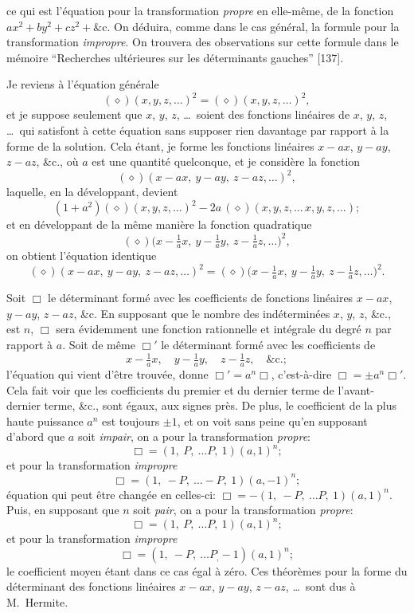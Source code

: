 \documentclass[11pt,a4paper]{article}
\begin{document}
\medskip

\noindent ce qui est l'\'equation pour la transformation \textit{propre} en elle-m\^eme, de la fonction $ax^2 + by^2 + cz^2 + \&\mathrm{c}.$ On d\'eduira, comme dans le cas g\'en\'eral, la formule pour la transformation \textit{impropre}. On trouvera des observations sur cette formule dans le m\'emoire ``Recherches ult\'erieures sur les d\'eterminants gauches'' [137].

\medskip

Je reviens \`a l'\'equation g\'en\'erale
\[
(\diamond)(x,y,z,\ldots)^2 = (\diamond)(x,y,z,\ldots)^2,
\]
et je suppose seulement que $x$, $y$, $z$, \ldots\ soient des fonctions lin\'eaires de $x$, $y$, $z$, \ldots\ qui satisfont \`a cette \'equation sans supposer rien davantage par rapport \`a la forme de la solution. Cela \'etant, je forme les fonctions lin\'eaires $x - ax$, $y - ay$, $z - az$, \&c., o\`u $a$ est une quantit\'e quelconque, et je consid\`ere la fonction
\[
(\diamond)(x - ax,\ y - ay,\ z - az,\ldots)^2,
\]
laquelle, en la d\'eveloppant, devient
\[
(1 + a^2)(\diamond)(x,y,z,\ldots)^2 - 2a\,(\diamond)(x,y,z,\ldots\,x,y,z,\ldots);
\]
et en d\'eveloppant de la m\^eme mani\`ere la fonction quadratique
\[
(\diamond)\bigl(x - \tfrac{1}{a}x,\ y - \tfrac{1}{a}y,\ z - \tfrac{1}{a}z,\ldots\bigr)^2,
\]
on obtient l'\'equation identique
\[
(\diamond)(x - ax,\ y - ay,\ z - az,\ldots)^2 = (\diamond)\bigl(x - \tfrac{1}{a}x,\ y - \tfrac{1}{a}y,\ z - \tfrac{1}{a}z,\ldots\bigr)^2.
\]

\medskip

Soit $\Box$ le d\'eterminant form\'e avec les coefficients de fonctions lin\'eaires $x - ax$, $y - ay$, $z - az$, \&c. En supposant que le nombre des ind\'etermin\'ees $x$, $y$, $z$, \&c., est $n$, $\Box$ sera \'evidemment une fonction rationnelle et int\'egrale du degr\'e $n$ par rapport \`a $a$. Soit de m\^eme $\Box'$ le d\'eterminant form\'e avec les coefficients de
\[
x - \tfrac{1}{a}x,\quad y - \tfrac{1}{a}y,\quad z - \tfrac{1}{a}z,\quad\&\mathrm{c.};
\]
l'\'equation qui vient d'\^etre trouv\'ee, donne $\Box' = a^n \Box$, c'est-\`a-dire $\Box = \pm a^n \Box'$. Cela fait voir que les coefficients du premier et du dernier terme de l'avant-dernier terme, \&c., sont \'egaux, aux signes pr\`es. De plus, le coefficient de la plus haute puissance $a^n$ est toujours $\pm 1$, et on voit sans peine qu'en supposant d'abord que $a$ soit \textit{impair}, on a pour la transformation \textit{propre}:
\[
\Box = (1,\ P,\ \ldots P,\ 1)(a,1)^n;
\]
et pour la transformation \textit{impropre}
\[
\Box = (1,\ -P,\ \ldots -P,\ 1)(a,-1)^n;
\]
\'equation qui peut \^etre chang\'ee en celles-ci: $\Box = -(1,\ -P,\ \ldots P,\ 1)(a,1)^n$. Puis, en supposant que $n$ soit \textit{pair}, on a pour la transformation \textit{propre}:
\[
\Box = (1,\ P,\ \ldots P,\ 1)(a,1)^n;
\]
et pour la transformation \textit{impropre}
\[
\Box = (1,\ -P,\ \ldots P_{,} - 1)(a,1)^n;
\]
le coefficient moyen \'etant dans ce cas \'egal \`a z\'ero. Ces th\'eor\`emes pour la forme du d\'eterminant des fonctions lin\'eaires $x - ax$, $y - ay$, $z - az$, \ldots\ sont dus \`a M.~Hermite.
\end{document}
